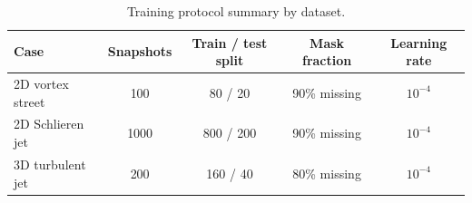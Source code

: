 \begin{table}[htbp]
  \centering
  \caption{Training protocol summary by dataset.}
  \label{tab:et:training}
  \begin{tabular}{lcccc}
    \toprule
    Case & Snapshots & Train / test split & Mask fraction & Learning rate \\
    \midrule
    2D vortex street & 100 & 80 / 20 & 90\% missing & $10^{-4}$ \\
    2D Schlieren jet  & 1000 & 800 / 200 & 90\% missing & $10^{-4}$ \\
    3D turbulent jet  & 200 & 160 / 40 & 80\% missing & $10^{-4}$ \\
    \bottomrule
  \end{tabular}
\end{table}
